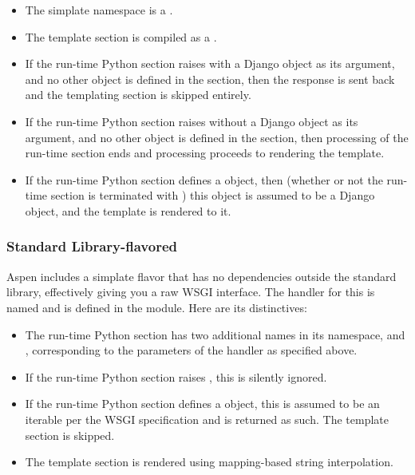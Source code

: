 \begin{itemize}

\item{The simplate namespace is a .}

\item{The template section is compiled as a .}

\item{If the run-time Python section raises  with a Django
 object as its argument, and no other  object
is defined in the section, then the  response is sent back and
the templating section is skipped entirely.}

\item{If the run-time Python section raises  without a Django
 object as its argument, and no other  object
is defined in the section, then processing of the run-time section ends and
processing proceeds to rendering the template.}

\item{If the run-time Python section defines a  object, then
(whether or not the run-time section is terminated with ) this
object is assumed to be a Django  object, and the template
is rendered to it.}

\end{itemize}


\subsubsection{Standard Library-flavored}

Aspen includes a simplate flavor that has no dependencies outside the standard
library, effectively giving you a raw WSGI interface. The handler for this is
named  and is defined in the
 module. Here are its distinctives:

\begin{itemize}

\item{The run-time Python section has two additional names in its namespace,
 and , corresponding to the parameters of the
handler as specified above.}

\item{If the run-time Python section raises , this is silently
ignored.}

\item{If the run-time Python section defines a  object, this is
assumed to be an iterable per the WSGI specification and is returned as such.
The template section is skipped.}

\item{The template section is rendered using mapping-based string
interpolation.}

\end{itemize}


